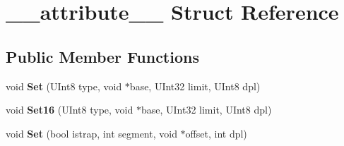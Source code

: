 \hypertarget{struct____attribute____}{}\section{\+\_\+\+\_\+attribute\+\_\+\+\_\+ Struct Reference}
\label{struct____attribute____}
\subsection*{Public Member Functions}
\begin{DoxyCompactItemize}
\item 
\mbox{\label{struct____attribute_____a473a3c3e9ad38687e1f539501ff621aa}} 
void {\bfseries Set} (U\+Int8 type, void $\ast$base, U\+Int32 limit, U\+Int8 dpl)
\item 
\mbox{\label{struct____attribute_____a7a0619295680e5787b20f44ad1336c00}} 
void {\bfseries Set16} (U\+Int8 type, void $\ast$base, U\+Int32 limit, U\+Int8 dpl)
\item 
\mbox{\label{struct____attribute_____a24e76c5985d0ceb90872b662691dcd76}} 
void {\bfseries Set} (bool istrap, int segment, void $\ast$offset, int dpl)
\end{DoxyCompactItemize}
